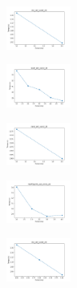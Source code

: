 \begin{figure}[H]    
    \centering
    \begin{subfigure}
        \centering
        \includegraphics[width=0.234\textwidth]{img/copkm2/iris_set_const_20_949004259_time.png}
    \end{subfigure}
    \hfill
    \begin{subfigure}
        \centering
        \includegraphics[width=0.234\textwidth]{img/copkm2/ecoli_set_const_20_949004259_time.png}
    \end{subfigure}
    \hfill
    \begin{subfigure}
        \centering
        \includegraphics[width=0.234\textwidth]{img/copkm2/rand_set_const_20_949004259_time.png}
    \end{subfigure}
    \hfill
    \begin{subfigure}
        \centering
        \includegraphics[width=0.234\textwidth]{img/copkm2/newthyroid_set_const_20_949004259_time.png}
    \end{subfigure}
    \hfill
    \begin{subfigure}
        \centering
        \includegraphics[width=0.234\textwidth]{img/copkm2/iris_set_const_20_589741062_time.png}
    \end{subfigure}

\end{figure}

